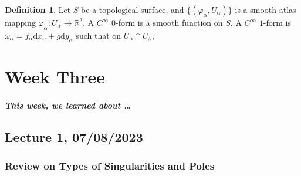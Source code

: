 \documentclass[a4paper]{report}
\theoremstyle{definition}
\newtheorem{definition}{Definition}
\theoremstyle{remark}
\theoremstyle{proposition}
\theoremstyle{conjecture}
\theoremstyle{lemma}
\theoremstyle{corollary}
\theoremstyle{exercise}
\newtheorem{exercise}{Exercise}
\theoremstyle{example}
\newcommand{\C}{\mathbb{C}}
\begin{document}
\begin{definition}
    Let $S$ be a topological surface, and $\lbrace (\varphi_\alpha, U_\alpha)\rbrace$ is a smooth atlas mapping $\varphi_\alpha:U_\alpha \to \mathbb{R}^2$. 
    A $C^\infty$ $0$-form is a smooth function on $S$. A $C^\infty$ $1$-form 
    is $\omega_\alpha= f_\alpha \mathrm{d}x_\alpha + g \mathrm{d}y_\alpha$
    such that on $U_\alpha \cap U_\beta$, 
\end{definition}

%
%
%

\chapter{Week Three}

\paragraph{This week, we learned about \ldots}

\section{Lecture 1, 07/08/2023}

\subsection{Review on Types of Singularities and Poles}
\end{document}
